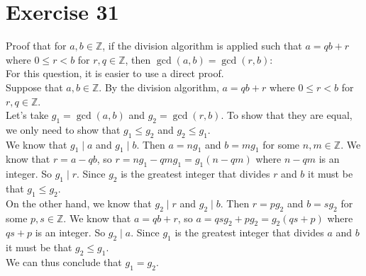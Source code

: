 \documentclass[12pt]{article}
\newcommand{\Z}{\mathbb{Z}}
\begin{document}
    \section*{Exercise 31}
    Proof that for $a, b \in \Z$,
    if the division algorithm is applied such that $a = qb + r$
    where $0 \leqslant r < b$ for  $r, q \in \Z$,
    then $\gcd(a, b) = \gcd(r, b)$: \\
    For this question, it is easier to use a direct proof. \\
    Suppose that $a, b \in \Z$.
    By the division algorithm, $a = qb + r$
    where $0 \leqslant r < b$ for  $r, q \in \Z$. \\
    Let's take $g_1 = \gcd(a, b)$ and $g_2 = \gcd(r, b)$.
    To show that they are equal,
    we only need to show that $g_1 \leqslant g_2$
    and $g_2 \leqslant g_1$. \\
    We know that $g_1 \mid a$ and $g_1 \mid b$.
    Then $a = ng_1$ and $b = mg_1$
    for some $n, m \in \Z$.
    We know that $r = a - qb$,
    so $r = ng_1 - qmg_1 = g_1(n - qm)$
    where $n - qm$ is an integer.
    So $g_1 \mid r$.
    Since $g_2$ is the greatest integer that
    divides $r$ and $b$
    it must be that $g_1 \leqslant g_2$. \\
    On the other hand, we know that $g_2 \mid r$ and $g_2 \mid b$.
    Then $r = pg_2$ and $b = sg_2$
    for some $p, s \in \Z$.
    We know that $a = qb + r$,
    so $a = qsg_2 + pg_2 = g_2(qs + p)$
    where $qs + p$ is an integer.
    So $g_2 \mid a$.
    Since $g_1$ is the greatest integer that
    divides $a$ and $b$
    it must be that $g_2 \leqslant g_1$. \\
    We can thus conclude that $g_1 = g_2$. \\
\end{document}
